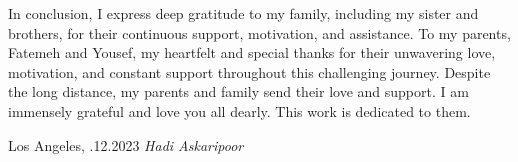         In conclusion, I express deep gratitude to my family, including my sister and brothers, for their continuous support, motivation, and assistance. To my parents, Fatemeh and Yousef, my heartfelt and special thanks for their unwavering love, motivation, and constant support throughout this challenging journey. Despite the long distance, my parents and family send their love and support. I am immensely grateful and love you all dearly. This work is dedicated to them.



        
        
        
        
        
        
        \vfill%
        Los Angeles, .{12}.{2023} \hfill\textit{Hadi Askaripoor}%
        \vspace*{2cm}%
